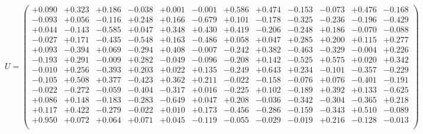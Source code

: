 \documentclass[9pt]{article}
\theoremstyle{plain}
\theoremstyle{definition}
\theoremstyle{remark}
\numberwithin{equation}{section}
\begin{document}
$U = \left(
\begin{array}{
cccccccccccc}
+0.090 & +0.323 & +0.186 & -0.038 & +0.001 & -0.001 & +0.586 & +0.474 & -0.153 & -0.073 & +0.476 & -0.168 \\
-0.093 & +0.056 & -0.116 & +0.248 & +0.166 & -0.679 & +0.101 & -0.178 & -0.325 & -0.236 & -0.196 & -0.429 \\
+0.044 & -0.143 & -0.585 & +0.047 & +0.348 & +0.430 & +0.419 & -0.206 & -0.248 & +0.186 & -0.070 & -0.088 \\
-0.027 & +0.171 & -0.435 & -0.548 & +0.163 & -0.486 & +0.058 & +0.047 & +0.285 & +0.200 & +0.115 & +0.277 \\
+0.093 & -0.394 & +0.069 & -0.294 & +0.408 & -0.007 & -0.242 & +0.382 & -0.463 & -0.329 & -0.004 & +0.226 \\
-0.193 & +0.291 & -0.009 & +0.282 & -0.049 & -0.096 & -0.208 & +0.142 & -0.525 & +0.575 & +0.020 & +0.342 \\
-0.010 & +0.256 & -0.393 & +0.203 & +0.022 & +0.135 & -0.249 & +0.643 & +0.234 & -0.101 & -0.357 & -0.229 \\
-0.105 & +0.508 & +0.377 & -0.423 & +0.362 & +0.211 & -0.022 & -0.158 & -0.076 & +0.076 & -0.401 & -0.191 \\
-0.022 & -0.272 & -0.059 & -0.404 & -0.317 & +0.016 & -0.225 & +0.102 & -0.189 & +0.392 & +0.133 & -0.625 \\
+0.086 & +0.148 & -0.183 & -0.283 & -0.649 & +0.047 & +0.208 & -0.036 & -0.342 & -0.304 & -0.365 & +0.218 \\
+0.117 & +0.422 & -0.279 & -0.022 & +0.010 & +0.173 & -0.456 & -0.286 & -0.159 & -0.343 & +0.510 & -0.089 \\
+0.950 & +0.072 & +0.064 & +0.071 & +0.045 & -0.119 & -0.055 & -0.029 & -0.019 & +0.216 & -0.128 & -0.013 \\
\end{array}
\right)$ \newline 
\end{document}
